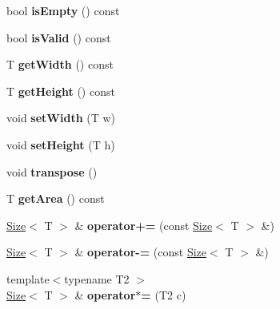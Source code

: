 \begin{DoxyCompactItemize}
\item 
\hypertarget{class_size_a2feb6af7868053ec23b4eea7f2cc64dd}{
bool {\bfseries isEmpty} () const }
\label{class_size_a2feb6af7868053ec23b4eea7f2cc64dd}

\item 
\hypertarget{class_size_a72f90a2c7648b173a81d1535c45e1168}{
bool {\bfseries isValid} () const }
\label{class_size_a72f90a2c7648b173a81d1535c45e1168}

\item 
\hypertarget{class_size_a8f02c9a3825f72db52762c8c6dbac9f9}{
T {\bfseries getWidth} () const }
\label{class_size_a8f02c9a3825f72db52762c8c6dbac9f9}

\item 
\hypertarget{class_size_aaca336454ac27a1359a7f815da660ab4}{
T {\bfseries getHeight} () const }
\label{class_size_aaca336454ac27a1359a7f815da660ab4}

\item 
\hypertarget{class_size_a121262181e42aa1ca35b87eb072230fc}{
void {\bfseries setWidth} (T w)}
\label{class_size_a121262181e42aa1ca35b87eb072230fc}

\item 
\hypertarget{class_size_a31c905c24fc46fd7fb0ead3b27c883bf}{
void {\bfseries setHeight} (T h)}
\label{class_size_a31c905c24fc46fd7fb0ead3b27c883bf}

\item 
\hypertarget{class_size_ad4fe5e5347033c30961bf0bb68e2f2db}{
void {\bfseries transpose} ()}
\label{class_size_ad4fe5e5347033c30961bf0bb68e2f2db}

\item 
\hypertarget{class_size_adb5d429e93a45a4711a34a1b1b5d979f}{
T {\bfseries getArea} () const }
\label{class_size_adb5d429e93a45a4711a34a1b1b5d979f}

\item 
\hypertarget{class_size_a0ce6047fd3c0a883acd287b5b34d083b}{
\hyperlink{class_size}{Size}$<$ T $>$ \& {\bfseries operator+=} (const \hyperlink{class_size}{Size}$<$ T $>$ \&)}
\label{class_size_a0ce6047fd3c0a883acd287b5b34d083b}

\item 
\hypertarget{class_size_a9f6d6f2e34d1d3ff3c288bb25e08ad8f}{
\hyperlink{class_size}{Size}$<$ T $>$ \& {\bfseries operator-\/=} (const \hyperlink{class_size}{Size}$<$ T $>$ \&)}
\label{class_size_a9f6d6f2e34d1d3ff3c288bb25e08ad8f}

\item 
\hypertarget{class_size_aab38c063fa04e4f22cfccab0f6417433}{
{\footnotesize template$<$typename T2 $>$ }\\\hyperlink{class_size}{Size}$<$ T $>$ \& {\bfseries operator$\ast$=} (T2 c)}
\label{class_size_aab38c063fa04e4f22cfccab0f6417433}


\end{DoxyCompactItemize}
